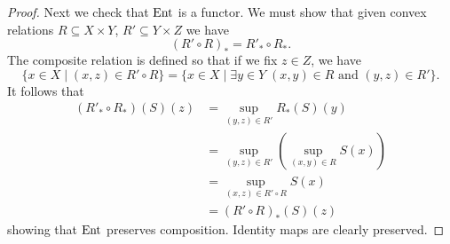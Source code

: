 \documentclass[12pt, reqno]{amsart}
\begin{document}
\begin{proof}
    Next we check that $\mathrm{Ent}$ is a functor. We must show that given convex relations $R \subseteq X \times Y$, $R' \subseteq Y \times Z$ we have
    \[   (R' \circ R)_* = R'_* \circ R_* .\]
    The composite relation is defined so that if we fix $z \in Z$, we have
    \[ \{x \in X \mid (x, z) \in R' \circ R\} = \{x \in X \mid \exists y \in Y \; (x, y) \in R \textrm{ and } (y, z) \in R'\}. \]
    It follows that
    \begin{align*}
        (R'_* \circ R_*) (S)(z)
        &= \sup_{(y, z) \in R'} R_*(S)(y)
        \\&= \sup_{(y, z) \in R'} \left( \sup_{(x, y) \in R} S(x) \right)
        \\&= \sup_{(x, z) \in R' \circ R} S(x)
        \\&= (R' \circ R)_* (S)(z)
    \end{align*}
    showing that $\mathrm{Ent}$ preserves composition. Identity maps are clearly preserved.
\end{proof}
\end{document}
